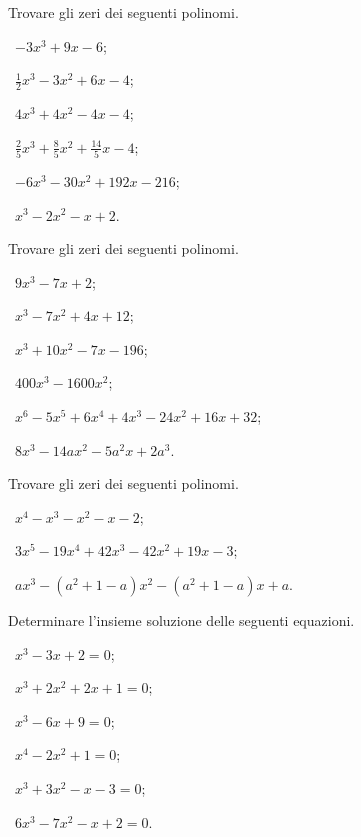 \begin{esercizio}[\Ast]
 \label{ese:5.3}
Trovare gli zeri dei seguenti polinomi.
\begin{multicols}{2}
 \begin{enumeratea}
 \item~$-3x^3+9x-6$;
 \item~$\frac 1 2x^3-3x^2+6x-4$;
 \item~$4x^3+4x^2-4x-4$;
 \item~$\frac 2 5x^3+\frac 8 5x^2+\frac{14} 5x-4$;
 \item~$-6x^3-30x^2+192x-216$;
 \item~$x^3-2x^2-x+2$.
 \end{enumeratea}
 \end{multicols}
\end{esercizio}

\begin{esercizio}[\Ast]
 \label{ese:5.4}
Trovare gli zeri dei seguenti polinomi.
\begin{multicols}{2}
 \begin{enumeratea}
 \item~$9x^3-7x+2$;
 \item~$x^3-7x^2+4x+12$;
 \item~$ x^3+10x^2-7x-196 $;
 \item~$ 400x^3-1600x^2$;
 \item~$x^6-5x^5+6x^4+4x^3-24x^2+16x+32 $;
 \item~$ 8x^3-14{ax}^2-5a^2x+2a^3 $.
 \end{enumeratea}
 \end{multicols}
\end{esercizio}

\begin{esercizio}
\label{ese:5.5}
Trovare gli zeri dei seguenti polinomi.
\begin{multicols}{2}
 \begin{enumeratea}
 \item~$ x^4-x^3-x^2-x-2 $;
 \item~$ 3x^5-19x^4+42x^3-42x^2+19x-3 $;
 \item~$ {ax}^3-(a^2+1-a)x^2-(a^2+1-a)x+a $.
 \end{enumeratea}
 \end{multicols}
\end{esercizio}

\begin{esercizio}[\Ast]
\label{ese:5.6}
Determinare l'insieme soluzione delle seguenti equazioni.
\begin{multicols}{2}
 \begin{enumeratea}
 \item~$x^3-3x+2=0$;
 \item~$x^3+2x^2+2x+1=0$;
 \item~$x^3-6x+9=0$;
 \item~$x^4-2x^2+1=0$;
 \item~$x^3+3x^2-x-3=0$;
 \item~$6x^3-7x^2-x+2=0$.
 \end{enumeratea}
 \end{multicols}
\end{esercizio}

